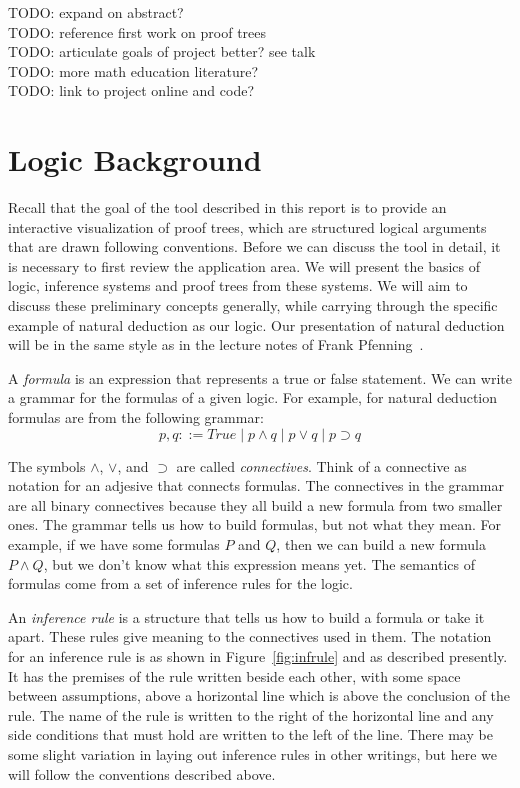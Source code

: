 \documentclass[conference]{IEEEtran}
\begin{document}
TODO: expand on abstract? \\

TODO: reference first work on proof trees \\

TODO: articulate goals of project better? see talk \\

TODO: more math education literature? \\

TODO: link to project online and code? \\

\section{Logic Background}
\label{sec:background}

Recall that the goal of the tool described in this report is to provide an interactive visualization of proof trees, which are structured logical arguments that are drawn following conventions. Before we can discuss the tool in detail, it is necessary to first review the application area. We will present the basics of logic, inference systems and proof trees from these systems. We will aim to discuss these preliminary concepts generally, while carrying through the specific example of natural deduction as our logic. Our presentation of natural deduction will be in the same style as in the lecture notes of Frank Pfenning~\cite{natded-pfenning}.

A \textit{formula} is an expression that represents a true or false statement. We can write a grammar for the formulas of a given logic. For example, for natural deduction formulas are from the following grammar:
$$
p, q ::= \mathit{True} \; | \; p \wedge q \; | \; p \vee q \; | \; p \supset q
$$

The symbols $\wedge$, $\vee$, and $\supset$ are called \textit{connectives}. Think of a connective as notation for an adjesive that connects formulas. The connectives in the grammar are all binary connectives because they all build a new formula from two smaller ones. The grammar tells us how to build formulas, but not what they mean. For example, if we have some formulas $P$ and $Q$, then we can build a new formula $P \wedge Q$, but we don't know what this expression means yet. The semantics of formulas come from a set of inference rules for the logic.

An \textit{inference rule} is a structure that tells us how to build a formula or take it apart. These rules give meaning to the connectives used in them. The notation for an inference rule is as shown in Figure~\ref{fig:infrule} and as described presently. It has the premises of the rule written beside each other, with some space between assumptions, above a horizontal line which is above the conclusion of the rule. The name of the rule is written to the right of the horizontal line and any side conditions that must hold are written to the left of the line. There may be some slight variation in laying out inference rules in other writings, but here we will follow the conventions described above.
\end{document}
